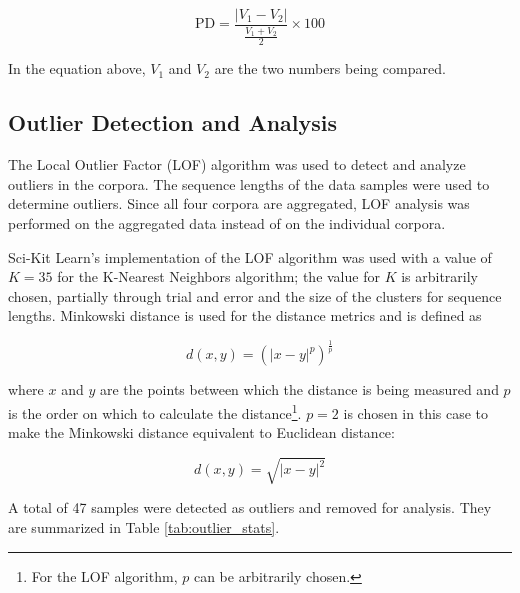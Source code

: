 \documentclass[12pt]{article}
\begin{document}
\begin{equation}\label{eq:percent_difference}
    \mbox{PD} = \frac{|V_1 - V_2|}{\frac{V_1 + V_2}{2}} \times 100
\end{equation}

\noindent
In the equation above, $V_1$ and $V_2$ are the two numbers being compared.

\subsection{Outlier Detection and Analysis}\label{sec:outliers}
The Local Outlier Factor (LOF) algorithm \cite{breunig_lof_2000} was used to detect and analyze outliers in the corpora. The sequence lengths of the
data samples were used to determine outliers. Since all four corpora are aggregated, LOF analysis was performed on the aggregated data instead of on
the individual corpora.

Sci-Kit Learn's \cite{pedregosa_scikit-learn_2011} implementation of the LOF algorithm was used with a value of $K = 35$ for the K-Nearest Neighbors
algorithm; the value for $K$ is arbitrarily chosen, partially through trial and error and the size of the clusters for sequence lengths. Minkowski
distance is used for the distance metrics and is defined as

\begin{equation}\label{eq:minkowski_distance}
    d(x, y) = (|x - y|^p)^{\frac{1}{p}}
\end{equation}

\noindent
where $x$ and $y$ are the points between which the distance is being measured and $p$ is the order on which to calculate the distance\footnote{For
    the LOF algorithm, $p$ can be arbitrarily chosen.}. $p=2$ is chosen in this case to make the Minkowski distance equivalent to Euclidean distance:

\begin{equation}\label{eq:euclidean_distance}
    d(x, y) = \sqrt{|x-y|^2}
\end{equation}

\noindent
A total of 47 samples were detected as outliers and removed for analysis. They are summarized in Table \ref{tab:outlier_stats}.
\end{document}
